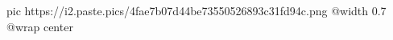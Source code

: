  
 
 
 
 

\ifcmt
	pic https://i2.paste.pics/4fae7b07d44be73550526893c31fd94c.png
  @width 0.7
	@wrap center
\fi
